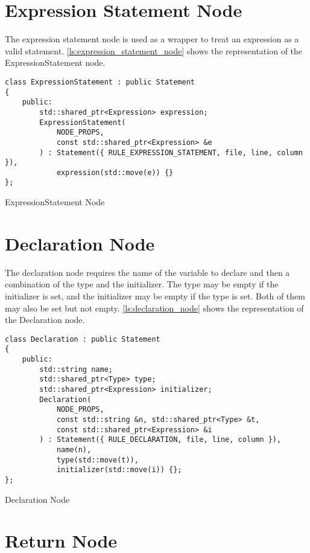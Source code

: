 \section{Expression Statement Node}

The expression statement node is used as a wrapper to treat an expression as a valid statement.
\autoref{ls:expression_statement_node} shows the representation of the ExpressionStatement node.

\begin{listing}[H]
\begin{verbatim}
class ExpressionStatement : public Statement
{
    public:
        std::shared_ptr<Expression> expression;
        ExpressionStatement(
            NODE_PROPS,
            const std::shared_ptr<Expression> &e
        ) : Statement({ RULE_EXPRESSION_STATEMENT, file, line, column }),
            expression(std::move(e)) {}
};
\end{verbatim}
\caption{ExpressionStatement Node}
\label{ls:expression_statement_node}
\end{listing}

\section{Declaration Node}

The declaration node requires the name of the variable to declare and then a combination of the type and the initializer.
The type may be empty if the initializer is set, and the initializer may be empty if the type is set. Both of them may also be set
but not empty.
\autoref{ls:declaration_node} shows the representation of the Declaration node.

\begin{listing}[H]
\begin{verbatim}
class Declaration : public Statement
{
    public:
        std::string name;
        std::shared_ptr<Type> type;
        std::shared_ptr<Expression> initializer;
        Declaration(
            NODE_PROPS,
            const std::string &n, std::shared_ptr<Type> &t,
            const std::shared_ptr<Expression> &i
        ) : Statement({ RULE_DECLARATION, file, line, column }),
            name(n),
            type(std::move(t)),
            initializer(std::move(i)) {};
};
\end{verbatim}
\caption{Declaration Node}
\label{ls:declaration_node}
\end{listing}

\section{Return Node}

